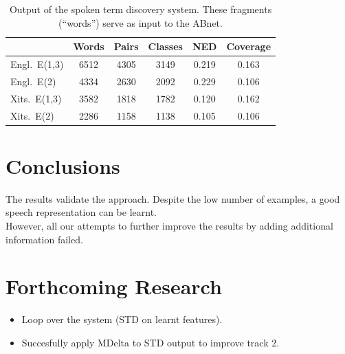 \documentclass[final]{beamer}
\newcommand{\abnet}{{\sc ABnet}}
\begin{document}
\begin{frame}[t]
\begin{multicols}{3}
\begin{table}[h]
\caption{\label{tab:std-stats} Output of the spoken term discovery system. These fragments (``words'') serve as input to the \abnet{}.}
\small
\begin{tabular}{lccccc}
\hline
         & Words & Pairs & Classes & NED   & Coverage \\
\hline
Engl.~E(1,3) & 6512 & 4305 & 3149 & 0.219 & 0.163 \\
Engl.~E(2) & 4334 & 2630 & 2092 & 0.229 & 0.106 \\
Xits.~E(1,3) & 3582 & 1818 & 1782 & 0.120 & 0.162 \\
Xits.~E(2) & 2286 & 1158 & 1138 &  0.105 & 0.106 \\
\hline
\end{tabular}
\end{table}



\section{Conclusions}

The results validate the approach. Despite the low number of examples, a good speech representation can be learnt.\\
However, all our attempts to further improve the results by adding additional information failed.



\section{Forthcoming Research}

\begin{itemize}
\item Loop over the system (STD on learnt features).
\item Succesfully apply MDelta to STD output to improve track 2.
\end{itemize}


\end{multicols}
\end{frame}
\end{document}
